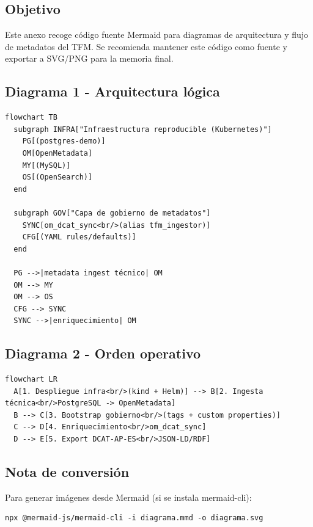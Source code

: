 \subsection*{Objetivo}
Este anexo recoge código fuente Mermaid para diagramas de arquitectura y flujo de metadatos del TFM.
Se recomienda mantener este código como fuente y exportar a SVG/PNG para la memoria final.

\subsection*{Diagrama 1 - Arquitectura lógica}
\begin{verbatim}
flowchart TB
  subgraph INFRA["Infraestructura reproducible (Kubernetes)"]
    PG[(postgres-demo)]
    OM[OpenMetadata]
    MY[(MySQL)]
    OS[(OpenSearch)]
  end

  subgraph GOV["Capa de gobierno de metadatos"]
    SYNC[om_dcat_sync<br/>(alias tfm_ingestor)]
    CFG[(YAML rules/defaults)]
  end

  PG -->|metadata ingest técnico| OM
  OM --> MY
  OM --> OS
  CFG --> SYNC
  SYNC -->|enriquecimiento| OM
\end{verbatim}

\subsection*{Diagrama 2 - Orden operativo}
\begin{verbatim}
flowchart LR
  A[1. Despliegue infra<br/>(kind + Helm)] --> B[2. Ingesta técnica<br/>PostgreSQL -> OpenMetadata]
  B --> C[3. Bootstrap gobierno<br/>(tags + custom properties)]
  C --> D[4. Enriquecimiento<br/>om_dcat_sync]
  D --> E[5. Export DCAT-AP-ES<br/>JSON-LD/RDF]
\end{verbatim}

\subsection*{Nota de conversión}
Para generar imágenes desde Mermaid (si se instala mermaid-cli):
\begin{verbatim}
npx @mermaid-js/mermaid-cli -i diagrama.mmd -o diagrama.svg
\end{verbatim}
